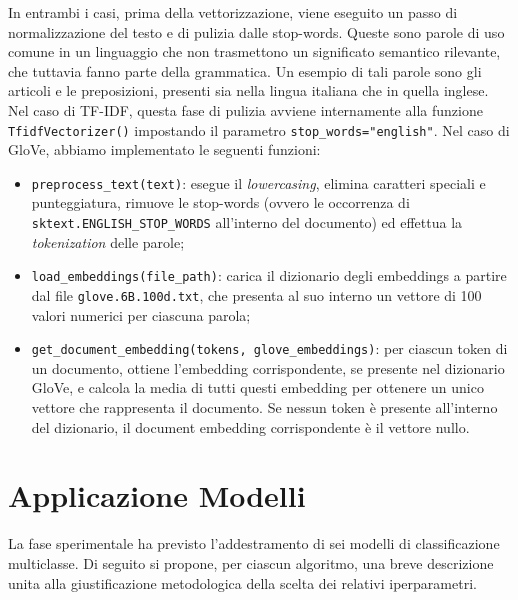 \documentclass[12pt, a4paper, twoside]{article}
\numberwithin{table}{section}
\begin{document}
    In entrambi i casi, prima della vettorizzazione, viene eseguito un passo di normalizzazione del testo e di pulizia
    dalle stop-words. Queste sono parole di uso comune in un linguaggio che non trasmettono un significato semantico
    rilevante, che tuttavia fanno parte della grammatica. Un esempio di tali parole sono gli articoli e le preposizioni, presenti sia nella
    lingua italiana che in quella inglese. Nel caso di TF-IDF, questa fase di pulizia avviene internamente alla funzione \texttt{TfidfVectorizer()} impostando il
    parametro \texttt{stop\_words="english"}. Nel caso di GloVe, abbiamo implementato le seguenti funzioni:
    \begin{itemize}
        \item \texttt{preprocess\_text(text)}: esegue il \textit{lowercasing}, elimina caratteri speciali e punteggiatura, rimuove le stop-words (ovvero le occorrenza di \texttt{sktext.ENGLISH\_STOP\_WORDS} all'interno del documento) ed effettua la \textit{tokenization} delle parole; 
        \item \texttt{load\_embeddings(file\_path)}: carica il dizionario degli embeddings a partire dal file \texttt{glove.6B.100d.txt}, che presenta al suo interno un vettore di 100 valori numerici per ciascuna parola;
        \item \texttt{get\_document\_embedding(tokens, glove\_embeddings)}: per ciascun token di un documento, ottiene l'embedding corrispondente, se presente nel dizionario GloVe, e calcola la media di tutti questi embedding per ottenere un unico vettore che rappresenta il documento. Se nessun token è presente all'interno del dizionario, il document embedding corrispondente è il vettore nullo.  
    \end{itemize}

    \pagebreak
    \thispagestyle{plain}
    \section{Applicazione Modelli}
    \label{sec:application-of-models}
    La fase sperimentale ha previsto l'addestramento di sei modelli di classificazione multiclasse. Di seguito si propone, 
    per ciascun algoritmo, una breve descrizione unita alla giustificazione metodologica della scelta dei relativi iperparametri.
    
\end{document}
